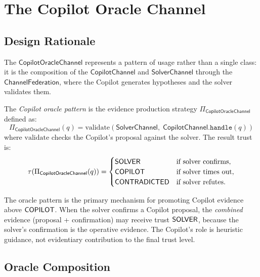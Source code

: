 \documentclass[11pt]{article}
\newcommand{\CopOracle}{\mathsf{CopilotOracleChannel}}
\newcommand{\OracleValid}{\mathrm{validate}}
\newcommand{\CopChan}{\mathsf{CopilotChannel}}
\newcommand{\SolChan}{\mathsf{SolverChannel}}
\newcommand{\ChanFed}{\mathsf{ChannelFederation}}
\begin{document}
\section{The Copilot Oracle Channel}
\label{sec:oracle}

\subsection{Design Rationale}
\label{sec:oracle:rationale}

The $\CopOracle$ represents a pattern of usage rather than a
single class: it is the composition of the $\CopChan$ and
$\SolChan$ through the $\ChanFed$, where the Copilot
generates hypotheses and the solver validates them.

\begin{definition}
\label{def:cop-oracle}
The \emph{Copilot oracle pattern} is the evidence production
strategy $\Pi_{\CopOracle}$ defined as:
\[
  \Pi_{\CopOracle}(q) = \OracleValid(\SolChan,\; \CopChan.\texttt{handle}(q))
\]
where $\OracleValid$ checks the Copilot's proposal against the
solver.  The result trust is:
\[
  \tau(\Pi_{\CopOracle}(q)) = \begin{cases}
    \Tsolver & \text{if solver confirms}, \\
    \Tcopilot & \text{if solver times out}, \\
    \Tcontra & \text{if solver refutes}.
  \end{cases}
\]
\end{definition}

\begin{remark}
\label{rem:trust-promotion}
The oracle pattern is the primary mechanism for promoting
Copilot evidence above $\mathsf{COPILOT}$.  When the solver confirms
a Copilot proposal, the \emph{combined} evidence (proposal +
confirmation) may receive trust $\mathsf{SOLVER}$, because the solver's
confirmation is the operative evidence.  The Copilot's role is
heuristic guidance, not evidentiary contribution to the final
trust level.
\end{remark}

\subsection{Oracle Composition}
\label{sec:oracle:composition}
\end{document}
